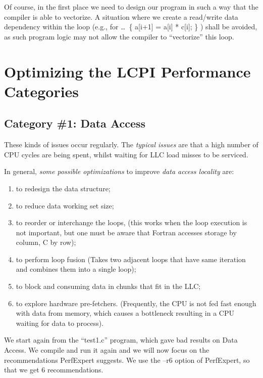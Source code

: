 Of course, in the first place we need to design our program in such a way that the compiler is able to vectorize. A situation where we create a read/write data dependency within the loop (e.g., for \ldots\  \{ a[i+1] = a[i] * c[i]; \} ) shall be avoided, as such program logic may not allow the compiler to ``vectorize'' this loop.

\section{Optimizing the LCPI Performance Categories}
\label{sec:Optimizing_the_LCPI_Performance_Categories}

\subsection{Category \#1: Data Access}
\label{subsec:CAT1_Data_Access}

These kinds of issues occur regularly. The \emph{typical issues} are that a high number of CPU cycles are being spent, whilst waiting for LLC load misses to be serviced.

In general, \emph{some possible optimizations} to improve \emph{data access locality} are:

\begin{enumerate}
  \item  to redesign the data structure;
  \item  to reduce data working set size;
  \item  to reorder or interchange the loops, (this works when the loop execution is not important, but one must be aware that Fortran accesses storage by column, C by row);
  \item  to perform loop fusion (Takes two adjacent loops that have same iteration and combines them into a single loop);
  \item  to block and consuming data in chunks that fit in the LLC;
  \item  to explore hardware pre-fetchers. (Frequently, the CPU is not fed fast enough with data from memory, which causes a bottleneck resulting in a CPU waiting for data to process).
\end{enumerate}

We start again from the ``test1.c'' program, which gave bad results on Data Access. We compile and run it again and we will now focus on the recommendations PerfExpert suggests. We use the --r6 option of PerfExpert, so that we get 6 recommendations.

